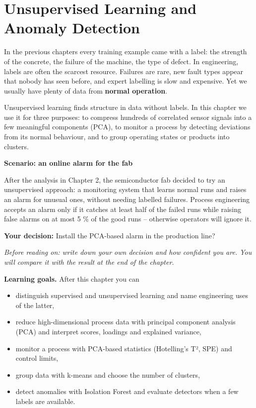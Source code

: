 \documentclass[
  letterpaper,
  DIV=11,
  numbers=noendperiod]{scrreprt}
\providecommand{\tightlist}{%
  \setlength{\itemsep}{0pt}\setlength{\parskip}{0pt}}\usepackage{longtable,booktabs,array}
\begin{document}
\chapter{Unsupervised Learning and Anomaly
Detection}\label{unsupervised-learning-and-anomaly-detection}

In the previous chapters every training example came with a label: the
strength of the concrete, the failure of the machine, the type of
defect. In engineering, labels are often the scarcest resource. Failures
are rare, new fault types appear that nobody has seen before, and expert
labelling is slow and expensive. Yet we usually have plenty of data from
\textbf{normal operation}.

Unsupervised learning finds structure in data without labels. In this
chapter we use it for three purposes: to compress hundreds of correlated
sensor signals into a few meaningful components (PCA), to monitor a
process by detecting deviations from its normal behaviour, and to group
operating states or products into clusters.

\textbf{Scenario: an online alarm for the fab}

After the analysis in Chapter 2, the semiconductor fab decided to try an
unsupervised approach: a monitoring system that learns normal runs and
raises an alarm for unusual ones, without needing labelled failures.
Process engineering accepts an alarm only if it catches at least half of
the failed runs while raising false alarms on at most 5 \% of the good
runs -- otherwise operators will ignore it.

\textbf{Your decision:} Install the PCA-based alarm in the production
line?

\emph{Before reading on: write down your own decision and how confident
you are. You will compare it with the result at the end of the chapter.}

\textbf{Learning goals.} After this chapter you can

\begin{itemize}
\tightlist
\item
  distinguish supervised and unsupervised learning and name engineering
  uses of the latter,
\item
  reduce high-dimensional process data with principal component analysis
  (PCA) and interpret scores, loadings and explained variance,
\item
  monitor a process with PCA-based statistics (Hotelling's T², SPE) and
  control limits,
\item
  group data with k-means and choose the number of clusters,
\item
  detect anomalies with Isolation Forest and evaluate detectors when a
  few labels are available.
\end{itemize}
\end{document}
